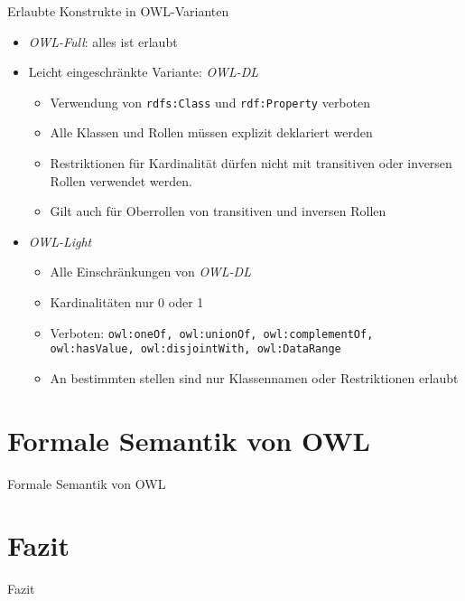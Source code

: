 \documentclass{beamer}
\begin{document}
\begin{frame}{Erlaubte Konstrukte in OWL-Varianten}
\begin{itemize}
\item \emph{OWL-Full}: alles ist erlaubt
\item Leicht eingeschränkte Variante: \emph{OWL-DL}
\begin{itemize}
\item Verwendung von \texttt{rdfs:Class} und \texttt{rdf:Property} verboten
\item Alle Klassen und Rollen müssen explizit deklariert werden
\item Restriktionen für Kardinalität dürfen nicht mit transitiven oder
inversen Rollen verwendet werden.
\item Gilt auch für Oberrollen von transitiven und inversen Rollen
\end{itemize}
\item \emph{OWL-Light}
\begin{itemize}
\item Alle Einschränkungen von \emph{OWL-DL}
\item Kardinalitäten nur 0 oder 1
\item Verboten: \texttt{owl:oneOf, owl:unionOf, owl:complementOf,
owl:hasValue, owl:disjointWith, owl:DataRange}
\item An bestimmten stellen sind nur Klassennamen oder Restriktionen
erlaubt
\end{itemize}
\end{itemize}
\end{frame} 



\section{Formale Semantik von OWL}

\begin{frame}{Formale Semantik von OWL}
\end{frame}


\section{Fazit}
\begin{frame}{Fazit}
\end{frame}
\end{document}
